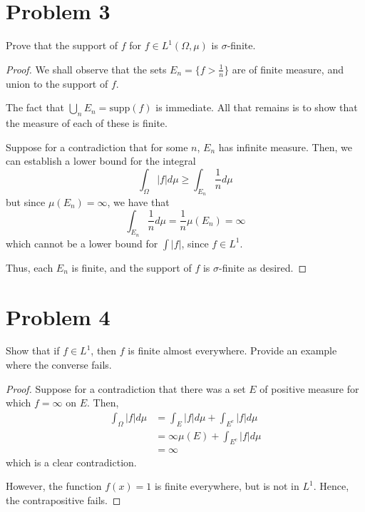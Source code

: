 \documentclass[fontsize=11pt]{scrartcl} %
\numberwithin{equation}{section} %
\numberwithin{figure}{section} %
\numberwithin{table}{section} %
\theoremstyle{definition}
\begin{document}
\section*{Problem 3}
Prove that the support of $f$ for $f\in L^1(\Omega,\mu)$ is $\sigma$-finite.
\\
\begin{proof}
We shall observe that the sets $E_n = \{f>\frac{1}{n}\}$ are of finite measure, and
union to the support of $f$.

The fact that $\bigcup_n E_n = \textrm{supp}(f)$ is immediate. All that remains is to
show that the measure of each of these is finite.

Suppose for a contradiction that for some $n$, $E_n$ has infinite measure. Then,
we can establish a lower bound for the integral
\[
\int_{\Omega}|f|d\mu \geq \int_{E_n}\frac{1}{n}d\mu
\]
but since $\mu(E_n)=\infty$, we have that
\[
\int_{E_n}\frac{1}{n}d\mu = \frac{1}{n}\mu(E_n) = \infty
\]
which cannot be a lower bound for $\int |f|$, since $f\in L^1$.

Thus, each $E_n$ is finite, and the support of $f$ is $\sigma$-finite as desired.
\end{proof}
\section*{Problem 4}
Show that if $f\in L^1$, then $f$ is finite almost everywhere. Provide an example where
the converse fails.
\\
\begin{proof}
Suppose for a contradiction that there was a set $E$ of positive measure for which $f=\infty$
on $E$. Then,
\[
\begin{aligned}
\int_{\Omega}|f|d\mu  &= \int_E|f|d\mu + \int_{E^c}|f|d\mu\\
                    &= \infty\mu(E) + \int_{E^c}|f|d\mu\\
                    &=\infty
\end{aligned}
\]
which is a clear contradiction.

However, the function $f(x) = 1$ is finite everywhere, but is not in $L^1$. Hence, the contrapositive
fails.
\end{proof}
\newpage
\end{document}
